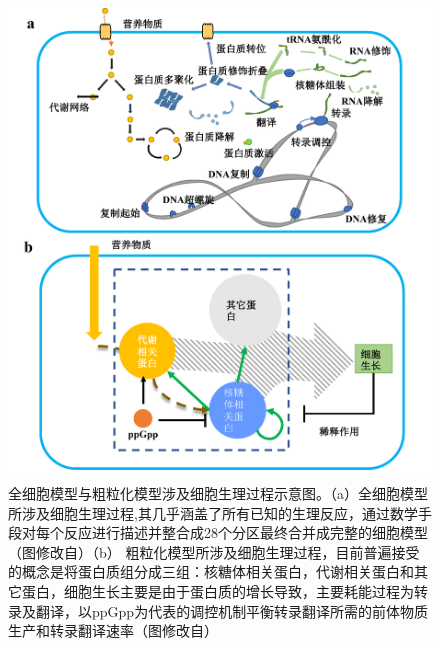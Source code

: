 \documentclass[b5paper,9pt,oneolumn,twoside,UTF8]{article}
\begin{document}
\begin{figure}[H]
  \centering
  \includegraphics[width=1.0\textwidth]{reviewer_figure2}
  \caption{全细胞模型与粗粒化模型涉及细胞生理过程示意图。{\scriptsize （a）全细胞模型所涉及细胞生理过程,其几乎涵盖了所有已知的生理反应，通过数学手段对每个反应进行描述并整合成28个分区最终合并成完整的细胞模型（图修改自\cite{karr2012whole}）（b） 粗粒化模型所涉及细胞生理过程，目前普遍接受的概念是将蛋白质组分成三组：核糖体相关蛋白，代谢相关蛋白和其它蛋白，细胞生长主要是由于蛋白质的增长导致，主要耗能过程为转录及翻译，以ppGpp为代表的调控机制平衡转录翻译所需的前体物质生产和转录翻译速率（图修改自\cite{Liao2017}）}}
  \label{fig.2}
\end{figure}
\end{document}
